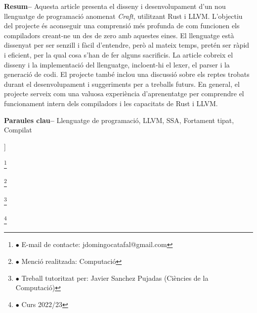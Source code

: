﻿\documentclass[10pt,a4paper,twocolumn,twoside]{article}
\newcommand\blfootnote[1]{%
  \begingroup
  \renewcommand\thefootnote{}\footnote{#1}%
  \addtocounter{footnote}{-1}%
  \endgroup
}
\begin{document}
\begin{@twocolumnfalse}
\begin{center}
{    \textbf{Resum--} Aquesta article presenta el disseny i desenvolupament d'un nou
    llenguatge de programació anomenat \textit{Craft}, utilitzant Rust i LLVM.
    L'objectiu del projecte és aconseguir una comprensió més profunda de com
    funcionen els compiladors creant-ne un des de zero amb aquestes eines. El
    llenguatge està dissenyat per ser senzill i fàcil d'entendre, però al mateix
    temps, pretén ser ràpid i eficient, per la qual cosa s'han de fer alguns
    sacrificis. La article cobreix el disseny i la implementació del llenguatge,
    incloent-hi el lexer, el parser i la generació de codi. El projecte també
    inclou una discussió sobre els reptes trobats durant el desenvolupament i
    suggeriments per a treballs futurs. En general, el projecte serveix com una
    valuosa experiència d'aprenentatge per comprendre el funcionament intern
    dels compiladors i les capacitats de Rust i LLVM.

    \bigskip

    \textbf{Paraules clau-- } Llenguatge de programació, LLVM, SSA, Fortament tipat, Compilat
}
\end{center}

\bigskip
\end{@twocolumnfalse}]

\blfootnote{$\bullet$ E-mail de contacte: jdomingocatafal@gmail.com}
\blfootnote{$\bullet$ Menció realitzada: Computació}
\blfootnote{$\bullet$ Treball tutoritzat per: Javier Sanchez Pujadas (Ciències de la Computació)}
\blfootnote{$\bullet$ Curs 2022/23}
\end{document}
